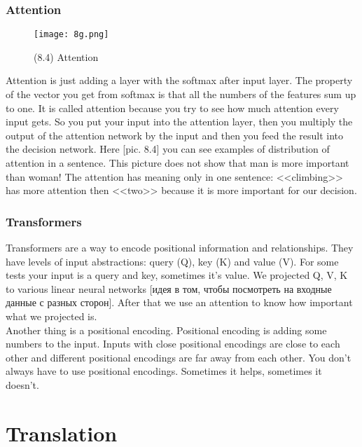 \subsubsection*{Attention}

\begin{wrapfigure}{r}{0.35\linewidth}
  \vspace{-1cm}
  \begin{center}
    \texttt{[image: 8g.png]}
  \end{center}
  \vspace{-0.6cm}
  \caption*{(8.4) Attention}
  \vspace{-0.6cm}
\end{wrapfigure}
Attention is just adding a layer with the softmax after input layer. The property of the vector you get from softmax is that all the numbers of the features sum up to one. It is called attention because you try to see how much attention every input gets. So you put your input into the attention layer, then you multiply the output of the attention network by the input and then you feed the result into the decision network. Here [pic. 8.4] you can see examples of distribution of attention in a sentence. This picture does not show that man is more important than woman! The attention has meaning only in one sentence: <<climbing>> has more attention then <<two>> because it is more important for our decision. 

\subsubsection*{Transformers}

Transformers are a way to encode positional information and relationships. They have levels of input abstractions: query (Q), key (K) and value (V). For some tests your input is a query and key, sometimes it's value. We projected Q, V, K to various linear neural networks [идея в том, чтобы посмотреть на входные данные с разных сторон]. After that we use an attention to know how important what we projected is.\\
Another thing is a positional encoding. Positional encoding is adding some numbers to the input. Inputs with close positional encodings are close to each other and different positional encodings are far away from each other. You don't always have to use positional encodings. Sometimes it helps, sometimes it doesn't.

\section{Translation}
\vspace{-0.6cm}
